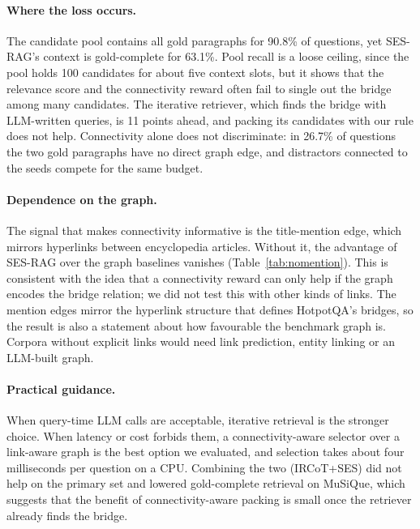 \paragraph{Where the loss occurs.}
The candidate pool contains all gold paragraphs for 90.8\% of questions, yet SES-RAG's context is gold-complete for 63.1\%. Pool recall is a loose ceiling, since the pool holds 100 candidates for about five context slots, but it shows that the relevance score and the connectivity reward often fail to single out the bridge among many candidates. The iterative retriever, which finds the bridge with LLM-written queries, is 11 points ahead, and packing its candidates with our rule does not help. Connectivity alone does not discriminate: in 26.7\% of questions the two gold paragraphs have no direct graph edge, and distractors connected to the seeds compete for the same budget.

\paragraph{Dependence on the graph.}
The signal that makes connectivity informative is the title-mention edge, which mirrors hyperlinks between encyclopedia articles. Without it, the advantage of SES-RAG over the graph baselines vanishes (Table~\ref{tab:nomention}). This is consistent with the idea that a connectivity reward can only help if the graph encodes the bridge relation; we did not test this with other kinds of links. The mention edges mirror the hyperlink structure that defines HotpotQA's bridges, so the result is also a statement about how favourable the benchmark graph is. Corpora without explicit links would need link prediction, entity linking or an LLM-built graph.

\paragraph{Practical guidance.}
When query-time LLM calls are acceptable, iterative retrieval is the stronger choice. When latency or cost forbids them, a connectivity-aware selector over a link-aware graph is the best option we evaluated, and selection takes about four milliseconds per question on a CPU. Combining the two (IRCoT+SES) did not help on the primary set and lowered gold-complete retrieval on MuSiQue, which suggests that the benefit of connectivity-aware packing is small once the retriever already finds the bridge.

